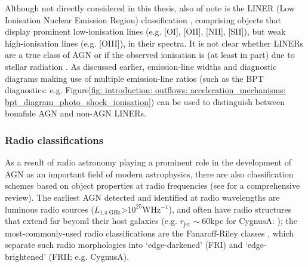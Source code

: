 Although not directly considered in this thesis, also of note is the LINER (Low Ionisation Nuclear Emission Region) classification \citep{Heckman1980}, comprising objects that display prominent low-ionisation lines (e.g. [OI], [OII], [NII], [SII]), but weak high-ionisation lines (e.g. [OIII]), in their spectra. It is not clear whether LINERs are a true class of AGN or if the observed ionisation is (at least in part) due to stellar radiation \citep{CidFernandes2011, Singh2013, Coldwell2018, Frederick2019}. As discussed earlier, emission-line widths and diagnostic diagrams making use of multiple emission-line ratios (such as the BPT diagnostics: e.g. Figure\;\ref{fig: introduction: outflows: acceleration_mechanisms: bpt_diagram_photo_shock_ionisation}) can be used to distinguish between bonafide AGN and non-AGN LINERs.


\subsubsection{Radio classifications}
\label{section: introduction: outflows: taxonomy_of_agn: css_and_gps_sources}

As a result of radio astronomy playing a prominent role in the development of AGN as an important field of modern astrophysics, there are also classification schemes based on object properties at radio frequencies (see \citealt{Tadhunter2016} for a comprehensive review). The earliest AGN detected and identified at radio wavelengths are luminous radio sources ($L_\mathrm{1.4\;GHz}$\;\textgreater\;$10^{25}$\;W\;Hz$^{-1}$), and often have radio structures that extend far beyond their host galaxies (e.g. $r_\mathrm{jet}\sim60$\;kpc for Cygnus\;A: \citealt{Carilli1991}); the most-commonly-used radio classifications are the Fanaroff-Riley classes \citep{Fanaroff1974}, which separate such radio morphologies into `edge-darkened' (FR\;I) and `edge-brightened' (FR\;II; e.g. Cygnus\;A).

